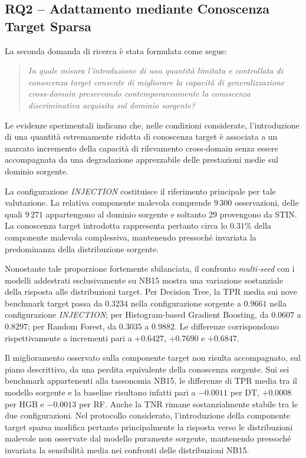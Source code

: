 
\subsection{RQ2 -- Adattamento mediante Conoscenza Target Sparsa}
\label{subsec:conclusioni_rq2}

La seconda domanda di ricerca è stata formulata come segue:

\begin{quote}
\textit{In quale misura l'introduzione di una quantità limitata e controllata di conoscenza target consente di migliorare la capacità di generalizzazione cross-domain preservando contemporaneamente la conoscenza discriminativa acquisita sul dominio sorgente?}
\end{quote}

Le evidenze sperimentali indicano che, nelle condizioni considerate, l'introduzione di una quantità estremamente ridotta di conoscenza target è associata a un marcato incremento della capacità di rilevamento cross-domain senza essere accompagnata da una degradazione apprezzabile delle prestazioni medie sul dominio sorgente.

La configurazione \textit{INJECTION} costituisce il riferimento principale per tale valutazione.
La relativa componente malevola comprende $9\,300$ osservazioni, delle quali $9\,271$ appartengono al dominio sorgente e soltanto $29$ provengono da STIN.
La conoscenza target introdotta rappresenta pertanto circa lo $0.31\%$ della componente malevola complessiva, mantenendo pressoché invariata la predominanza della distribuzione sorgente.

Nonostante tale proporzione fortemente sbilanciata, il confronto \textit{multi-seed} con i modelli addestrati esclusivamente su NB15 mostra una variazione sostanziale della risposta alle distribuzioni target.
Per Decision Tree, la TPR media sui nove benchmark target passa da $0.3234$ nella configurazione sorgente a $0.9661$ nella configurazione \textit{INJECTION}; per Histogram-based Gradient Boosting, da $0.0607$ a $0.8297$; per Random Forest, da $0.3035$ a $0.9882$.
Le differenze corrispondono rispettivamente a incrementi pari a $+0.6427$, $+0.7690$ e $+0.6847$.

Il miglioramento osservato sulla componente target non risulta accompagnato, sul piano descrittivo, da una perdita equivalente della conoscenza sorgente.
Sui sei benchmark appartenenti alla tassonomia NB15, le differenze di TPR media tra il modello sorgente e la baseline risultano infatti pari a $-0.0011$ per DT, $+0.0008$ per HGB e $-0.0013$ per RF.
Anche la TNR rimane sostanzialmente stabile tra le due configurazioni.
Nel protocollo considerato, l'introduzione della componente target sparsa modifica pertanto principalmente la risposta verso le distribuzioni malevole non osservate dal modello puramente sorgente, mantenendo pressoché invariata la sensibilità media nei confronti delle distribuzioni NB15.

